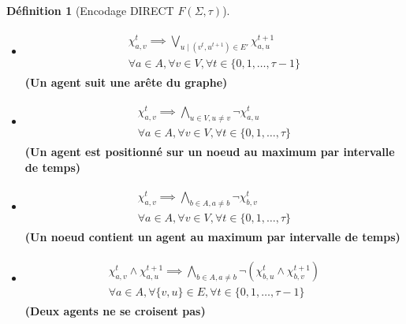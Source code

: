 \documentclass[french, 12pt, letterpaper]{article}
\theoremstyle{definition}
\newtheorem{definition}{Définition}[subsection]
\theoremstyle{proposition}
\theoremstyle{example}
\begin{document}
\begin{definition}[Encodage DIRECT $F(\Sigma, \tau)$]
        \begin{itemize}
            \item[] 
                \begin{gather}
                    \begin{split}
                        \chi_{a, v}^t \implies \bigvee_{u\;|\;( v^t, u^{t+1} ) \in E'} \chi_{a, u}^{t+1}
                        \\\forall a \in A, \forall v \in V, \forall t \in \{0, 1, \ldots, \tau-1\}
                    \end{split}
                \end{gather}
                \textbf{(Un agent suit une arête du graphe)}
            \item[] 
                \begin{gather}
                    \begin{split}
                        \chi_{a, v}^t \implies \bigwedge_{u \in V, u \neq v} \lnot \chi_{a, u}^t
                        \\\forall a \in A, \forall v \in V, \forall t \in \{0, 1, \ldots, \tau\}
                    \end{split}
                \end{gather}
                \textbf{(Un agent est positionné sur un noeud au maximum par intervalle de temps)}
            \item[] 
                \begin{gather}
                    \begin{split}
                        \chi_{a, v}^t \implies \bigwedge_{b \in A, a \neq b} \lnot \chi_{b, v}^t
                        \\\forall a \in A, \forall v \in V, \forall t \in \{0, 1, \ldots, \tau\}
                    \end{split}
                \end{gather}
                \textbf{(Un noeud contient un agent au maximum par intervalle de temps)}
            \item[] 
                \begin{gather}
                    \begin{split}
                        \chi_{a, v}^t \land \chi_{a, u}^{t+1} \implies \bigwedge_{b \in A, a \neq b} \lnot (\chi_{b, u}^t \land \chi_{b, v}^{t+1})
                        \\\forall a \in A, \forall \{v, u\} \in E, \forall t \in \{0, 1, \ldots, \tau-1\}
                    \end{split}
                \end{gather}
                \textbf{(Deux agents ne se croisent pas)}
        \end{itemize}
    \end{definition}
\end{document}
